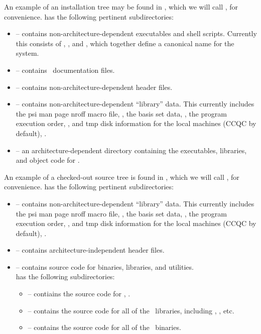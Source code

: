 An example of an installation tree may be found in , which we will call
, for convenience.
 has the following pertinent subdirectories:
\begin{itemize}
\item {} -- contains non-architecture-dependent executables and
shell scripts. Currently this consists of , , and , which
together define a canonical name for the system.
\item {} -- contains \PSIthree\ documentation files.
\item {} -- contains non-architecture-dependent header files.
\item {} -- contains non-architecture-dependent ``library'' data.
This currently includes the psi man page nroff macro file, , the basis
set data, , the program execution order, , and tmp disk
information for the local machines (CCQC by default), .
\item {}\file{/} -- an architecture-dependent directory
       containing the executables, libraries, and object code for \PSIthree.
\end{itemize}

An example of a checked-out source tree is found in ,
which we will call , for convenience. 
has the following pertinent subdirectories:
\begin{itemize}
\item {} -- contains non-architecture-dependent ``library'' data. This
currently includes the psi man page nroff macro file, , the basis
set data, , the program execution order, , and tmp disk
information for the local machines (CCQC by default), . 
\item {} -- contains architecture-independent header files.
\item {} -- contains source code for binaries,
libraries, and utilities. \\
 has the following subdirectories:
\begin{itemize}
\item {} -- contiains the source code for , .
\item {} -- contains the source code for all of the \PSIthree\ libraries,
including , , etc.
\item {} -- contains the source code for all of the \PSIthree\ 
binaries. 
\end{itemize}
\end{itemize}